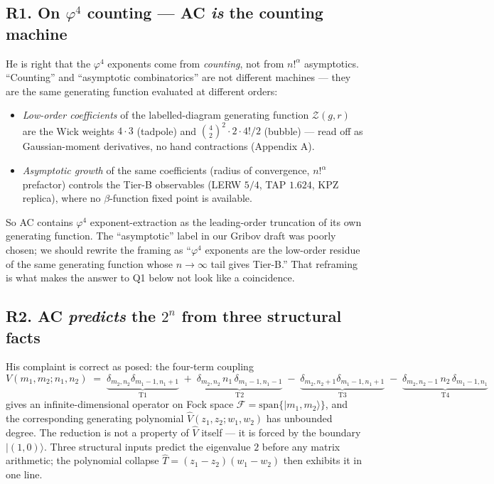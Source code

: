 \documentclass[11pt,a4paper]{article}
\begin{document}
\subsection*{R1. On $\varphi^4$ counting --- AC \emph{is} the counting machine}

He is right that the $\varphi^4$ exponents come from \emph{counting}, not from $n!^\alpha$ asymptotics. ``Counting'' and ``asymptotic combinatorics'' are not different machines --- they are the same generating function evaluated at different orders:
\begin{itemize}[leftmargin=2em,itemsep=2pt]
  \item \emph{Low-order coefficients} of the labelled-diagram generating function $\mathcal{Z}(g,r)$ are the Wick weights $4\cdot 3$ (tadpole) and $\binom{4}{2}^2\cdot 2\cdot 4!/2$ (bubble) --- read off as Gaussian-moment derivatives, no hand contractions (Appendix A).
  \item \emph{Asymptotic growth} of the same coefficients (radius of convergence, $n!^\alpha$ prefactor) controls the Tier-B observables (LERW $5/4$, TAP $1.624$, KPZ replica), where no $\beta$-function fixed point is available.
\end{itemize}
So AC contains $\varphi^4$ exponent-extraction as the leading-order truncation of its own generating function. The ``asymptotic'' label in our Gribov draft was poorly chosen; we should rewrite the framing as ``$\varphi^4$ exponents are the low-order residue of the same generating function whose $n\!\to\!\infty$ tail gives Tier-B.'' That reframing is what makes the answer to Q1 below not look like a coincidence.

\subsection*{R2. AC \emph{predicts} the $2^n$ from three structural facts}

His complaint is correct as posed: the four-term coupling
\[
V(m_1,m_2;n_1,n_2) \;=\; \underbrace{\delta_{m_2,n_2}\delta_{m_1{-}1,n_1{+}1}}_{\text{T1}}\;+\;\underbrace{\delta_{m_2,n_2}\,n_1\,\delta_{m_1{-}1,n_1{-}1}}_{\text{T2}}\;-\;\underbrace{\delta_{m_2,n_2{+}1}\delta_{m_1{-}1,n_1{+}1}}_{\text{T3}}\;-\;\underbrace{\delta_{m_2,n_2{-}1}\,n_2\,\delta_{m_1{-}1,n_1}}_{\text{T4}}
\]
gives an infinite-dimensional operator on Fock space $\mathcal{F}=\mathrm{span}\{|m_1,m_2\rangle\}$, and the corresponding generating polynomial $\widehat V(z_1,z_2;w_1,w_2)$ has unbounded degree. The reduction is not a property of $\widehat V$ itself --- it is forced by the boundary $|(1,0)\rangle$. Three structural inputs predict the eigenvalue $2$ before any matrix arithmetic; the polynomial collapse $\widehat T = (z_1-z_2)(w_1-w_2)$ then exhibits it in one line.
\end{document}
